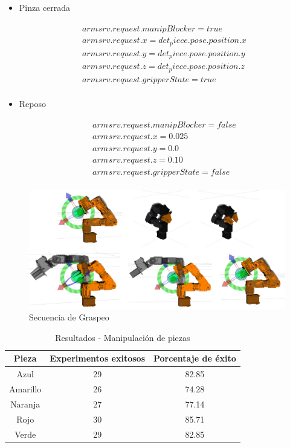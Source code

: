 \begin{itemize}
    \item Pinza cerrada
    \begin{multline*}
        \phantom{holis}\\
        arm_{}srv.request.manipBlocker = true\\
        arm_{}srv.request.x = det_piece.pose.position.x\\
        arm_{}srv.request.y = det_piece.pose.position.y\\
        arm_{}srv.request.z = det_piece.pose.position.z\\
        arm_{}srv.request.gripperState = true\\
    \end{multline*}
    
    \item Reposo
    \begin{multline*}
        \phantom{holis}\\
        arm_{}srv.request.manipBlocker = false\\
        arm_{}srv.request.x = 0.025\\
        arm_{}srv.request.y = 0.0\\
        arm_{}srv.request.z = 0.10\\
        arm_{}srv.request.gripperState = false\\
    \end{multline*}
\end{itemize}

\begin{figure}[H]
    \centering
    \includegraphics[scale=0.3]{Figures/Grasping_sequence.png}
        \caption{Secuencia de Graspeo}
        \label{fig:Grasping_Sequence}
\end{figure}

\begin{table}
    \centering
    \begin{tabular}{|c|c|c|}
    \hline
        \textbf{Pieza} & \textbf{Experimentos exitosos} & \textbf{Porcentaje de éxito}\\
    \hline
        Azul & 29 & 82.85\\
    \hline
        Amarillo & 26 & 74.28\\
    \hline
        Naranja & 27 & 77.14 \\
    \hline
        Rojo & 30 & 85.71 \\
    \hline
        Verde & 29 & 82.85 \\
    \hline
    \end{tabular}
    \caption{Resultados - Manipulación de piezas}
    \label{tab:Res-Man}
\end{table}

